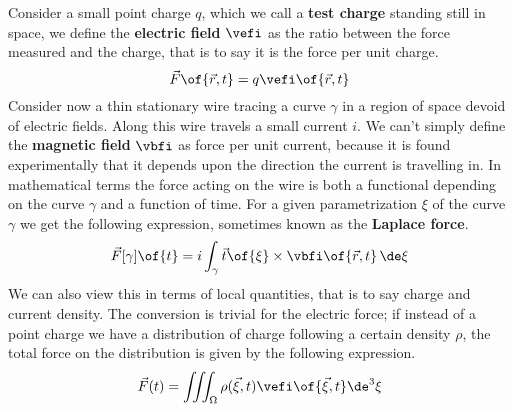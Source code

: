 Consider a small point charge \(q\), which we call a \textbf{test charge}
standing still in space, we define the \textbf{electric field} \(\vefi\) as the
ratio between the force measured and the charge, that is to say it is the force
per unit charge.
\[\vec{F}\of{\vec{r},t} = q \vefi\of{\vec{r},t}\]
Consider now a thin stationary wire tracing a curve \(\gamma\) in a region of space devoid
of electric fields. Along this wire travels a small current \(i\). We can't simply
define the \textbf{magnetic field} \(\vbfi\) as force per unit current, because
it is found experimentally that it depends upon the direction the current is
travelling in. In mathematical terms the force acting on the wire is both a functional
depending on the curve \(\gamma\) and a function of time. For a given parametrization
\(\xi\) of the curve \(\gamma\) we get the following expression, sometimes known as the \textbf{Laplace force}.
\[\vec{F}[\gamma]\of{t} = i \int_\gamma \vec{t}\of{\xi} \times \vbfi\of{\vec{r},t} \, \de\xi\]
We can also view this in terms of local quantities, that is to say charge and
current density.
The conversion is trivial for the electric force; if instead of a point charge
we have a distribution of charge following a certain density \(\rho\), the total
force on the distribution is given by the following expression.
\[\vec{F}(t) = \iiint_\Omega \rho(\vec{\xi},t) \vefi\of{\vec{\xi},t} \de^3\xi\]

